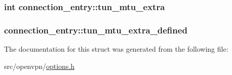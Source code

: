 \subsubsection[{tun\+\_\+mtu\+\_\+extra}]{\setlength{\rightskip}{0pt plus 5cm}int connection\+\_\+entry\+::tun\+\_\+mtu\+\_\+extra}\label{structconnection__entry_a1bdd5db16d783c90714bcf5c9ae1cdf6}
\hypertarget{structconnection__entry_a3d3ab06697dbc44a288e6f07b0bdbf3a}{}
\subsubsection[{tun\+\_\+mtu\+\_\+extra\+\_\+defined}]{ connection\+\_\+entry\+::tun\+\_\+mtu\+\_\+extra\+\_\+defined}\label{structconnection__entry_a3d3ab06697dbc44a288e6f07b0bdbf3a}


The documentation for this struct was generated from the following file\+:\begin{DoxyCompactItemize}
\item 
src/openvpn/\hyperlink{options_8h}{options.\+h}\end{DoxyCompactItemize}
